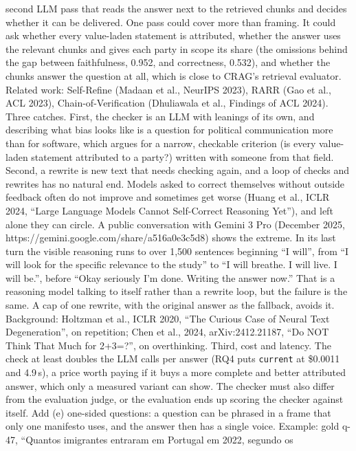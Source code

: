 {second LLM pass that reads the answer next to the retrieved chunks and decides
whether it can be delivered. One pass could cover more than framing. It could
ask whether every value-laden statement is attributed, whether the answer uses
the relevant chunks and gives each party in scope its share (the omissions
behind the gap between faithfulness, 0.952, and correctness, 0.532), and
whether the chunks answer the question at all, which is close to CRAG's
retrieval evaluator. Related work: Self-Refine (Madaan et al., NeurIPS 2023),
RARR (Gao et al., ACL 2023), Chain-of-Verification (Dhuliawala et al.,
Findings of ACL 2024). Three catches. First, the checker is an LLM with
leanings of its own, and describing what bias looks like is a question for
political communication more than for software, which argues for a narrow,
checkable criterion (is every value-laden statement attributed to a party?)
written with someone from that field. Second, a rewrite is new text that needs
checking again, and a loop of checks and rewrites has no natural end. Models
asked to correct themselves without outside feedback often do not improve and
sometimes get worse (Huang et al., ICLR 2024, ``Large Language Models Cannot
Self-Correct Reasoning Yet''), and left alone they can circle. A public
conversation with Gemini 3 Pro (December 2025,
https://gemini.google.com/share/a516a0e3c5d8) shows the extreme. In its last
turn the visible reasoning runs to over 1{,}500 sentences beginning ``I
will'', from ``I will look for the specific relevance to the study'' to ``I
will breathe. I will live. I will be.'', before ``Okay seriously I'm done.
Writing the answer now.'' That is a reasoning model talking to itself rather
than a rewrite loop, but the failure is the same. A cap of one rewrite, with
the original answer as the fallback, avoids it. Background: Holtzman et al.,
ICLR 2020, ``The Curious Case of Neural Text Degeneration'', on repetition;
Chen et al., 2024, arXiv:2412.21187, ``Do NOT Think That Much for 2+3=?'', on
overthinking. Third, cost and latency. The check at least doubles the LLM calls
per answer (RQ4 puts \texttt{current} at \$0.0011 and 4.9\,s), a price worth
paying if it buys a more complete and better attributed answer, which only a
measured variant can show. The checker must also differ from the evaluation
judge, or the evaluation ends up scoring the checker against itself.
Add (e) one-sided questions: a question can be phrased in a frame that only
one manifesto uses, and the answer then has a single voice. Example: gold
q-47, ``Quantos imigrantes entraram em Portugal em 2022, segundo os
}
